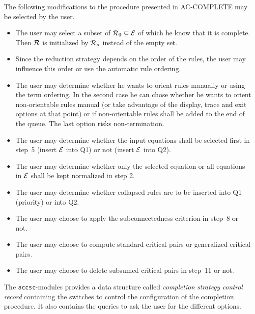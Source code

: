The following modifications to the procedure presented in
AC-COMPLETE  may be selected by the user.
\begin{itemize}
 \item The user may select a subset of ${\cal R}_0 \subseteq {\cal E}$
       of which he know that it is complete.
       Then $\cal R$ is initialized by ${\cal R}_o$ instead of the empty
       set.
 \item Since the reduction strategy depends on the order of the rules,
       the user may influence this order or use the automatic rule
       ordering.
 \item The user may determine whether he wants to orient rules manually
        or using the term ordering.
       In the second case he can chose whether he wants to orient 
       non-orientable rules manual (or take advantage of the
       display, trace and exit options at that point) or
       if non-orientable rules shall be added to the end of the
       queue. The last option risks non-termination.
 \item The user may determine whether the input equations shall be
       selected first in step~5 (insert $\cal E$ into Q1) or not
       (insert $\cal E$ into Q2).
 \item The user may determine whether only the selected equation or
        all equations in $\cal E$ shall be  kept normalized in step 2.
 \item The user may determine whether collapsed rules are to be inserted
       into Q1 (priority) or into Q2.
 \item The user may choose to apply the subconnectedness criterion in
       step~8 or not.
 \item The user may choose to compute standard critical pairs or
       generalized critical pairs.
 \item The user may choose to delete subsumed critical pairs in step~11
       or not.
\end{itemize}
The {\tt accsc}-modules provides a data structure called
{\em completion strategy control record} containing the
switches to control the configuration of the completion procedure.
It also contains the queries to ask the user for the different options.


